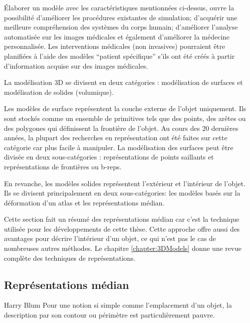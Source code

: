 Élaborer un modèle avec les caractéristiques mentionnées ci-dessus,
ouvre la possibilité d'améliorer les procédures existantes de simulation;
d'acquérir une meilleure compréhension des systèmes du corps humain;
d'améliorer l'analyse automatisée sur les images médicales et
également d'améliorer la médecine personnalisée.
Les interventions médicales (non invasives) pourraient être planifiées à l'aide
des modèles ``patient spécifique'' s'ils ont été créés à partir
d'information acquise sur des images médicales.

La modélisation 3D se divisent en deux catégories : modélisation de surfaces et modélisation de solides (volumique).

Les modèles de surface représentent la couche externe de l'objet uniquement. 
Ils sont stockés comme un ensemble de primitives tels que des points, des arêtes ou des polygones qui définissent la frontière de l'objet.
Au cours des 20 dernières années, la plupart des recherches en représentation ont été faites sur cette catégorie car  plus facile à manipuler.
La modélisation des surfaces peut être divisée en deux sous-catégories : représentations de points saillants et
représentations de frontières ou b-reps.

En revanche, les modèles solides représentent l'extérieur et l'intérieur de l'objet.
Ils se divisent principalement en deux sous-catégories: les modèles basés sur la déformation d'un atlas et les représentations médian.

Cette section fait un résumé des représentations médian
car c'est la technique utilisée pour les développements de cette thèse. 
Cette approche offre aussi des avantages pour décrire l'intérieur d'un objet, 
ce qui n'est pas le cas de nombreuses autres méthodes.
Le chapitre \ref{chapter:3DModels} donne une revue complète des techniques de représentations.

\subsection{Représentations médian}
\label{sec:quasiMedialfr}

\begin{chapquote}{Harry Blum}
  Pour une notion si simple comme l'emplacement d'un objet, la description par son contour ou périmètre est particulièrement pauvre.
\end{chapquote}

